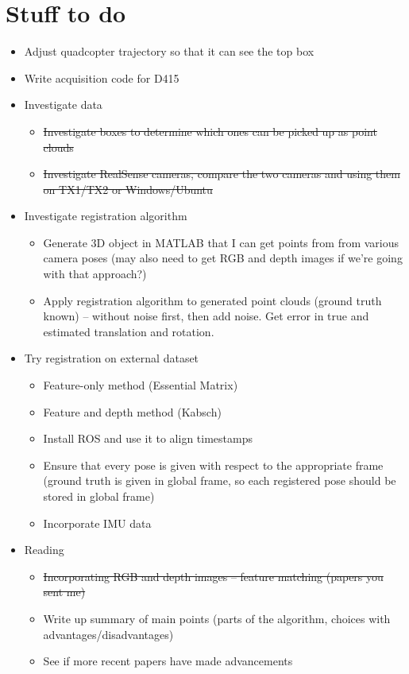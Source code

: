 \documentclass[12pt,a4paper]{article}
\begin{document}
\section{Stuff to do}
\begin{itemize}
\item Adjust quadcopter trajectory so that it can see the top box
\item Write acquisition code for D415
\item Investigate data
\begin{itemize}
\item \sout{Investigate boxes to determine which ones can be picked up as point clouds}
\item \sout{Investigate RealSense cameras, compare the two cameras and using them on TX1/TX2 or Windows/Ubuntu}
\end{itemize}
\item Investigate registration algorithm
\begin{itemize}
\item Generate 3D object in MATLAB that I can get points from from various camera poses (may also need to get RGB and depth images if we're going with that approach?)
\item Apply registration algorithm to generated point clouds (ground truth known) -- without noise first, then add noise. Get error in true and estimated translation and rotation.
\end{itemize}
\item Try registration on external dataset
\begin{itemize}
\item Feature-only method (Essential Matrix)
\item Feature and depth method (Kabsch)
\item Install ROS and use it to align timestamps
\item Ensure that every pose is given with respect to the appropriate frame (ground truth is given in global frame, so each registered pose should be stored in global frame)
\item Incorporate IMU data
\end{itemize}
\item Reading
\begin{itemize}
\item \sout{Incorporating RGB and depth images -- feature matching (papers you sent me)}
\item Write up summary of main points (parts of the algorithm, choices with advantages/disadvantages)
\item See if more recent papers have made advancements
\end{itemize}
\end{itemize}
\end{document}
